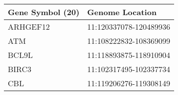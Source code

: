 \begin{tabular}{ll}
\toprule
Gene Symbol (20) &        Genome Location \\
\midrule
        ARHGEF12 & 11:120337078-120489936 \\
             ATM & 11:108222832-108369099 \\
           BCL9L & 11:118893875-118910904 \\
           BIRC3 & 11:102317495-102337734 \\
             CBL & 11:119206276-119308149 \\
\bottomrule
\end{tabular}
